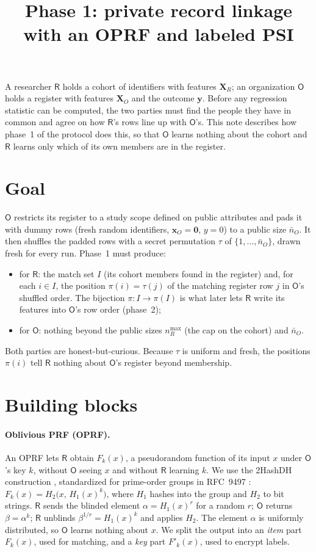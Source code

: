 \documentclass[10pt]{article}
\title{\vspace{-1.6em}\textbf{Phase 1: private record linkage with an OPRF and labeled PSI}}
\author{}
\date{\vspace{-3.2em}}
\newcommand{\Rp}{\mathsf{R}}
\newcommand{\Op}{\mathsf{O}}
\newcommand{\nR}{n_R^{\max}}
\newcommand{\nO}{\bar n_O}
\begin{document}
\maketitle

\noindent A researcher $\Rp$ holds a cohort of identifiers with features $\mathbf X_R$; an organization $\Op$ holds a register with features $\mathbf X_O$ and the outcome $\mathbf y$. Before any regression statistic can be computed, the two parties must find the people they have in common and agree on how $\Rp$'s rows line up with $\Op$'s. This note describes how phase~1 of the protocol does this, so that $\Op$ learns nothing about the cohort and $\Rp$ learns only which of its own members are in the register.

\section{Goal}

$\Op$ restricts its register to a study scope defined on public attributes and pads it with dummy rows (fresh random identifiers, $\mathbf x_O=\mathbf 0$, $y=0$) to a public size $\nO$. It then shuffles the padded rows with a secret permutation $\tau$ of $\{1,\dots,\nO\}$, drawn fresh for every run. Phase~1 must produce:
\begin{itemize}
  \item for $\Rp$: the match set $I$ (its cohort members found in the register) and, for each $i\in I$, the position $\pi(i)=\tau(j)$ of the matching register row $j$ in $\Op$'s shuffled order. The bijection $\pi: I\to\pi(I)$ is what later lets $\Rp$ write its features into $\Op$'s row order (phase~2);
  \item for $\Op$: nothing beyond the public sizes $\nR$ (the cap on the cohort) and $\nO$.
\end{itemize}
Both parties are honest-but-curious. Because $\tau$ is uniform and fresh, the positions $\pi(i)$ tell $\Rp$ nothing about $\Op$'s register beyond membership.

\section{Building blocks}

\paragraph{Oblivious PRF (OPRF).} An OPRF lets $\Rp$ obtain $F_k(x)$, a pseudorandom function of its input $x$ under $\Op$'s key $k$, without $\Op$ seeing $x$ and without $\Rp$ learning $k$. We use the 2HashDH construction \cite{jkk14}, standardized for prime-order groups in RFC~9497 \cite{rfc9497}: $F_k(x)=H_2\bigl(x,\,H_1(x)^k\bigr)$, where $H_1$ hashes into the group and $H_2$ to bit strings. $\Rp$ sends the blinded element $\alpha=H_1(x)^r$ for a random $r$; $\Op$ returns $\beta=\alpha^k$; $\Rp$ unblinds $\beta^{1/r}=H_1(x)^k$ and applies $H_2$. The element $\alpha$ is uniformly distributed, so $\Op$ learns nothing about $x$. We split the output into an \emph{item} part $F_k(x)$, used for matching, and a \emph{key} part $F'_k(x)$, used to encrypt labels.
\end{document}
